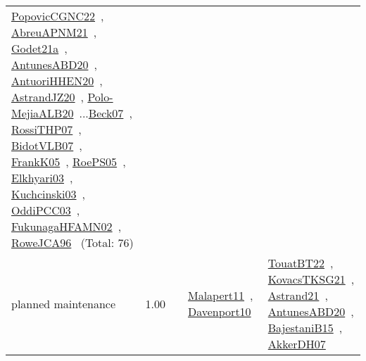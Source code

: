 {\begin{longtable}{p{3cm}r>{\raggedright\arraybackslash}p{6cm}>{\raggedright\arraybackslash}p{6cm}>{\raggedright\arraybackslash}p{8cm}}
\href{../works/PopovicCGNC22.pdf}{PopovicCGNC22}~\cite{PopovicCGNC22}, \href{../works/AbreuAPNM21.pdf}{AbreuAPNM21}~\cite{AbreuAPNM21}, \href{../works/Godet21a.pdf}{Godet21a}~\cite{Godet21a}, \href{../works/AntunesABD20.pdf}{AntunesABD20}~\cite{AntunesABD20}, \href{../works/AntuoriHHEN20.pdf}{AntuoriHHEN20}~\cite{AntuoriHHEN20}, \href{../works/AstrandJZ20.pdf}{AstrandJZ20}~\cite{AstrandJZ20}, \href{../works/Polo-MejiaALB20.pdf}{Polo-MejiaALB20}~\cite{Polo-MejiaALB20}...\href{../works/Beck07.pdf}{Beck07}~\cite{Beck07}, \href{../works/RossiTHP07.pdf}{RossiTHP07}~\cite{RossiTHP07}, \href{../works/BidotVLB07.pdf}{BidotVLB07}~\cite{BidotVLB07}, \href{../works/FrankK05.pdf}{FrankK05}~\cite{FrankK05}, \href{../works/RoePS05.pdf}{RoePS05}~\cite{RoePS05}, \href{../works/Elkhyari03.pdf}{Elkhyari03}~\cite{Elkhyari03}, \href{../works/Kuchcinski03.pdf}{Kuchcinski03}~\cite{Kuchcinski03}, \href{../works/OddiPCC03.pdf}{OddiPCC03}~\cite{OddiPCC03}, \href{../works/FukunagaHFAMN02.pdf}{FukunagaHFAMN02}~\cite{FukunagaHFAMN02}, \href{../works/RoweJCA96.pdf}{RoweJCA96}~\cite{RoweJCA96} (Total: 76)\\
\index{planned maintenance}\index{Concepts!planned maintenance}planned maintenance &  1.00 &  & \href{../works/Malapert11.pdf}{Malapert11}~\cite{Malapert11}, \href{../works/Davenport10.pdf}{Davenport10}~\cite{Davenport10} & \href{../works/TouatBT22.pdf}{TouatBT22}~\cite{TouatBT22}, \href{../works/KovacsTKSG21.pdf}{KovacsTKSG21}~\cite{KovacsTKSG21}, \href{../works/Astrand21.pdf}{Astrand21}~\cite{Astrand21}, \href{../works/AntunesABD20.pdf}{AntunesABD20}~\cite{AntunesABD20}, \href{../works/BajestaniB15.pdf}{BajestaniB15}~\cite{BajestaniB15}, \href{../works/AkkerDH07.pdf}{AkkerDH07}~\cite{AkkerDH07}\\

\end{longtable}}
